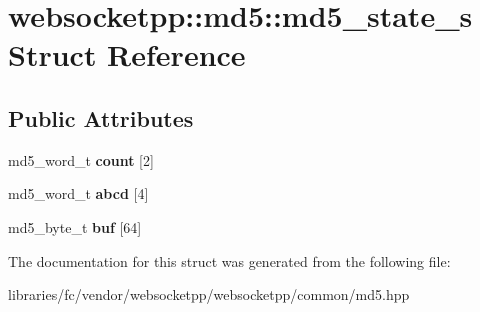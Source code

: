 \hypertarget{structwebsocketpp_1_1md5_1_1md5__state__s}{}\section{websocketpp\+:\+:md5\+:\+:md5\+\_\+state\+\_\+s Struct Reference}
\label{structwebsocketpp_1_1md5_1_1md5__state__s}
\subsection*{Public Attributes}
\begin{DoxyCompactItemize}
\item 
\mbox{\label{structwebsocketpp_1_1md5_1_1md5__state__s_a749f80b1f08f2e740e63a05a8821cf5c}} 
md5\+\_\+word\+\_\+t {\bfseries count} \mbox{[}2\mbox{]}
\item 
\mbox{\label{structwebsocketpp_1_1md5_1_1md5__state__s_a4579438de233e09db1f5994a341a3371}} 
md5\+\_\+word\+\_\+t {\bfseries abcd} \mbox{[}4\mbox{]}
\item 
\mbox{\label{structwebsocketpp_1_1md5_1_1md5__state__s_a4d3bae1432efcd8e294b910ee01ef39a}} 
md5\+\_\+byte\+\_\+t {\bfseries buf} \mbox{[}64\mbox{]}
\end{DoxyCompactItemize}


The documentation for this struct was generated from the following file\+:\begin{DoxyCompactItemize}
\item 
libraries/fc/vendor/websocketpp/websocketpp/common/md5.\+hpp\end{DoxyCompactItemize}
